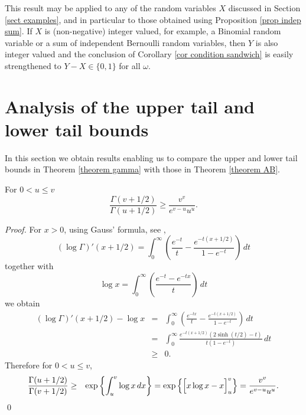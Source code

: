 \documentclass[smallextended,envcountsect]{svjour3}
\begin{document}
This result may be applied to any of the random variables $X$ discussed in Section \ref{sect examples}, and in particular to those obtained using Proposition \ref{prop indep sum}.  If $X$ is (non-negative) integer valued, for example, a Binomial random variable or a sum of independent Bernoulli random variables, then $Y$ is also integer valued and the conclusion of Corollary \ref{cor condition sandwich} is easily strengthened to $Y-X \in\{0,1\}$ for all $\omega$.

\section{Analysis of the upper tail and lower tail bounds} \label{sect upper and lower}

In this section we obtain results enabling us to compare the upper and lower tail bounds in Theorem \ref{theorem gamma} with those in Theorem \ref{theorem AB}.

\begin{lemma}   For $0 < u \le v$
       \begin{equation} \label{log gamma}
          \frac{\Gamma(v+1/2)}{\Gamma(u+1/2)} \ge \frac{v^v}{e^{v-u}u^u}.
        \end{equation}
\end{lemma}

\begin{proof}
For $x > 0$, using Gauss' formula, see \cite[Sect 12.3]{whittaker},
    $$
   ( \log \Gamma)'(x+ 1/2) = \int_0^\infty \left(\frac{e^{-t}}{t} - \frac{e^{-t(x+1/2)}}{1-e^{-t}}\right)\,dt
    $$
together with
   $$
        \log x = \int_0^\infty \left( \frac{e^{-t} - e^{-tx}}{t}\right)\,dt
        $$
we obtain
   \begin{eqnarray*}
   ( \log \Gamma)'(x+1/2) -  \log x
     & = & \int_0^\infty \left(\frac{e^{-tx}}{t} - \frac{e^{-t(x+1/2)}}{1-e^{-t}}\right)\,dt\\
     & = & \int_0^\infty \frac{e^{-t(x+1/2)}(2 \sinh (t/2) -t)}{t(1-e^{-t})}\,dt \\
     & \ge & 0.
   \end{eqnarray*}
Therefore for $0 < u \le v$,
  \begin{eqnarray*}
\frac{\Gamma(u+1/2)}{\Gamma(v+1/2)}
    & \ge & \exp\left\{ \int_u^v \log x \,dx \right\} = \exp\left\{ \left[\rule{0cm}{2.5ex}x \log x - x\right]_u^v\right\} = \frac{v^v}{e^{v-u}u^u}.
 \end{eqnarray*}
 \qed \end{proof}
\end{document}
